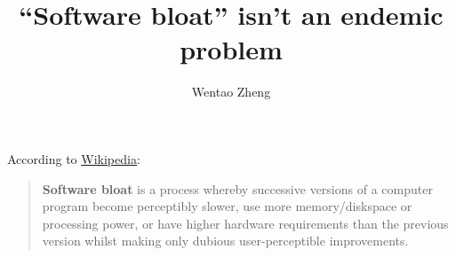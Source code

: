 \documentclass[a4paper, 11pt]{article}
\begin{document}
\title{``Software bloat'' isn't an endemic problem}
\author{Wentao Zheng}
\maketitle
\thispagestyle{empty}
\pagestyle{empty}

According to
\href{http://en.wikipedia.org/wiki/Software_bloat}{Wikipedia}:
\begin{quote}
  \textbf{Software bloat} is a process whereby successive versions of
  a computer program become perceptibly slower, use more
  memory/diskspace or processing power, or have higher hardware
  requirements than the previous version whilst making only dubious
  user-perceptible improvements.
\end{quote}
\end{document}
